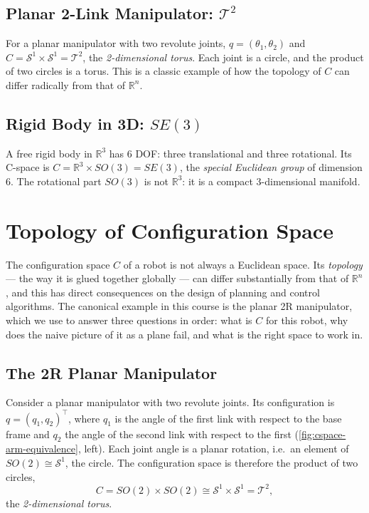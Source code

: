 \subsection{Planar 2-Link Manipulator: \( \mathcal{T}^2 \)}
\label{subsec:cspace-2link}

For a planar manipulator with two revolute joints,
\( q = (\theta_1, \theta_2) \) and
\( C = \mathcal{S}^1 \times \mathcal{S}^1 = \mathcal{T}^2 \), the
\emph{2-dimensional torus}. Each joint is a circle, and the product
of two circles is a torus. This is a classic example of how the
topology of \( C \) can differ radically from that of
\( \mathbb{R}^n \).

\subsection{Rigid Body in 3D: \( SE(3) \)}
\label{subsec:cspace-se3}

A free rigid body in \( \mathbb{R}^3 \) has 6 DOF: three translational
and three rotational. Its C-space is
\( C = \mathbb{R}^3 \times SO(3) = SE(3) \), the \emph{special
Euclidean group} of dimension 6. The rotational part \( SO(3) \) is
not \( \mathbb{R}^3 \): it is a compact 3-dimensional manifold.

\section{Topology of Configuration Space}
\label{sec:cspace-topology}

The configuration space \( C \) of a robot is not always a
Euclidean space. Its \emph{topology} --- the way it is glued together
globally --- can differ substantially from that of \( \mathbb{R}^n \),
and this has direct consequences on the design of planning and control
algorithms. The canonical example in this course is the planar 2R
manipulator, which we use to answer three questions in order: what is
\( C \) for this robot, why does the naive picture of it as a
plane fail, and what is the right space to work in.

\subsection{The 2R Planar Manipulator}
\label{subsec:cspace-2R-topology}

Consider a planar manipulator with two revolute joints. Its
configuration is \( q = (q_1, q_2)^\top \), where \( q_1 \) is the angle of
the first link with respect to the base frame and \( q_2 \) the angle of
the second link with respect to the first (\cref{fig:cspace-arm-equivalence},
left). Each joint angle is a planar rotation, i.e.\ an element of
\( SO(2) \cong \mathcal{S}^1 \), the circle. The configuration space is
therefore the product of two circles,
\[
C = SO(2) \times SO(2) \cong \mathcal{S}^1 \times \mathcal{S}^1
= \mathcal{T}^2,
\]
the \emph{2-dimensional torus}.

